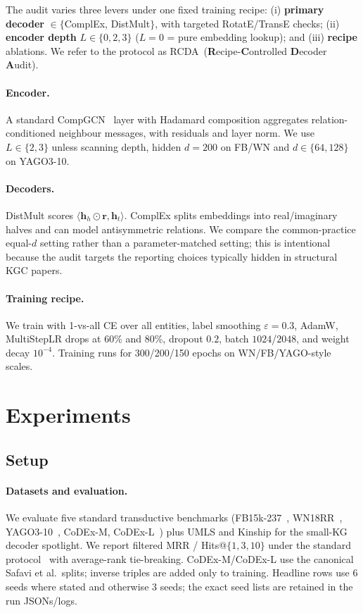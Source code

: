 \documentclass[runningheads]{llncs}
\newcommand{\ours}{\textsc{RCDA}\xspace}
\begin{document}
The audit varies three levers under one fixed training recipe: (i) \textbf{primary decoder} $\in \{$ComplEx, DistMult$\}$, with targeted RotatE/TransE checks; (ii) \textbf{encoder depth} $L \in \{0, 2, 3\}$ ($L{=}0$ = pure embedding lookup); and (iii) \textbf{recipe} ablations. We refer to the protocol as \ours\ (\textbf{R}ecipe-\textbf{C}ontrolled \textbf{D}ecoder \textbf{A}udit).

\paragraph{Encoder.}
A standard CompGCN~\cite{compgcn} layer with Hadamard composition aggregates relation-conditioned neighbour messages, with residuals and layer norm. We use $L \in \{2,3\}$ unless scanning depth, hidden $d{=}200$ on FB/WN and $d \in \{64,128\}$ on YAGO3-10.

\paragraph{Decoders.}
DistMult scores $\langle \mathbf{h}_h \odot \mathbf{r}, \mathbf{h}_t \rangle$. ComplEx splits embeddings into real/imaginary halves and can model antisymmetric relations. We compare the common-practice equal-$d$ setting rather than a parameter-matched setting; this is intentional because the audit targets the reporting choices typically hidden in structural KGC papers.

\paragraph{Training recipe.}
\label{sec:recipe}
We train with 1-vs-all CE over all entities, label smoothing $\varepsilon{=}0.3$, AdamW, MultiStepLR drops at 60\% and 80\%, dropout $0.2$, batch $1024$/$2048$, and weight decay $10^{-4}$. Training runs for 300/200/150 epochs on WN/FB/YAGO-style scales.

\section{Experiments}
\label{sec:experiments}

\subsection{Setup}
\label{sec:setup}

\paragraph{Datasets and evaluation.}
We evaluate five standard transductive benchmarks (FB15k-237~\cite{fb15k237}, WN18RR~\cite{wn18rr}, YAGO3-10~\cite{yago310}, CoDEx-M, CoDEx-L~\cite{safavi2020codex}) plus UMLS and Kinship for the small-KG decoder spotlight. We report filtered MRR / Hits@$\{1,3,10\}$ under the standard protocol~\cite{transe} with average-rank tie-breaking. CoDEx-M/CoDEx-L use the canonical Safavi et al.\ splits; inverse triples are added only to training. Headline rows use 6 seeds where stated and otherwise 3 seeds; the exact seed lists are retained in the run JSONs/logs.
\end{document}
